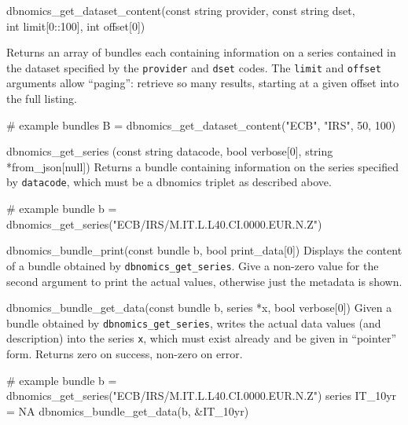 \documentclass{article}
\begin{document}
\begin{funcdoc}{dbnomics\_get\_dataset\_content(const string provider,
                                              const string dset, \\
                                              int limit[0::100], 
                                              int offset[0])}
                                            
Returns an array of bundles each containing information on a series
contained in the dataset specified by the \texttt{provider} and
\texttt{dset} codes. The \texttt{limit} and \texttt{offset}
arguments allow ``paging'': retrieve so many results, starting at a
given offset into the full listing.
\begin{code}
# example
bundles B = dbnomics_get_dataset_content("ECB", "IRS", 50, 100)
\end{code}
\end{funcdoc}

\begin{funcdoc}{dbnomics\_get\_series (const string datacode, bool
    verbose[0], string *from\_json[null])}
Returns a bundle containing information on the series specified by
\texttt{datacode}, which must be a \textsf{dbnomics} triplet as
described above.
\begin{code}
# example
bundle b = dbnomics_get_series("ECB/IRS/M.IT.L.L40.CI.0000.EUR.N.Z")
\end{code}
\end{funcdoc}

\begin{funcdoc}{dbnomics\_bundle\_print(const bundle b,
                                    bool print\_data[0])}
Displays the content of a bundle obtained by
\texttt{dbnomics\_get\_series}. Give a non-zero value for the second
argument to print the actual values, otherwise just the metadata is
shown.
\end{funcdoc}

\begin{funcdoc}{dbnomics\_bundle\_get\_data(const bundle b,
                                         series *x,
					 bool verbose[0])}
Given a bundle obtained by \texttt{dbnomics\_get\_series}, writes the
actual data values (and description) into the series \texttt{x}, which
must exist already and be given in ``pointer'' form. Returns zero on
success, non-zero on error.
\begin{code}
# example
bundle b = dbnomics_get_series("ECB/IRS/M.IT.L.L40.CI.0000.EUR.N.Z")
series IT_10yr = NA
dbnomics_bundle_get_data(b, &IT_10yr)
\end{code}
\end{funcdoc}
\end{document}
